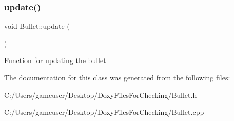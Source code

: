 \subsubsection{\texorpdfstring{update()}{update()}}
{\footnotesize\ttfamily void Bullet\+::update (\begin{DoxyParamCaption}{ }\end{DoxyParamCaption})}



Function for updating the bullet 



The documentation for this class was generated from the following files\+:\begin{DoxyCompactItemize}
\item 
C\+:/\+Users/gameuser/\+Desktop/\+Doxy\+Files\+For\+Checking/Bullet.\+h\item 
C\+:/\+Users/gameuser/\+Desktop/\+Doxy\+Files\+For\+Checking/Bullet.\+cpp\end{DoxyCompactItemize}
